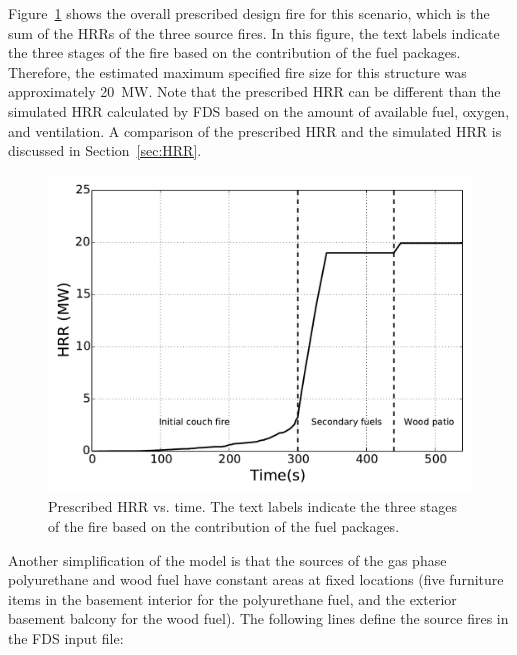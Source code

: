 \documentclass[12pt,oneside]{book}
\begin{document}
\clearpage


Figure~\ref{fig:hrr} shows the overall prescribed design fire for this scenario, which is the sum of the HRRs of the three source fires. In this figure, the text labels indicate the three stages of the fire based on the contribution of the fuel packages. Therefore, the estimated maximum specified fire size for this structure was approximately 20~MW. Note that the prescribed HRR can be different than the simulated HRR calculated by FDS based on the amount of available fuel, oxygen, and ventilation. A comparison of the prescribed HRR and the simulated HRR is discussed in Section~\ref{sec:HRR}.

\begin{figure}[!ht]
\includegraphics[width=5.5in]{../Figures/Fire_HRR}
\caption[Prescribed HRR vs. time.]
{Prescribed HRR vs. time. The text labels indicate the three stages of the fire based on the contribution of the fuel packages.}
\label{fig:hrr}
\end{figure}


\clearpage


Another simplification of the model is that the sources of the gas phase polyurethane and wood fuel have constant areas at fixed locations (five furniture items in the basement interior for the polyurethane fuel, and the exterior basement balcony for the wood fuel). The following lines define the source fires in the FDS input file:
\end{document}
